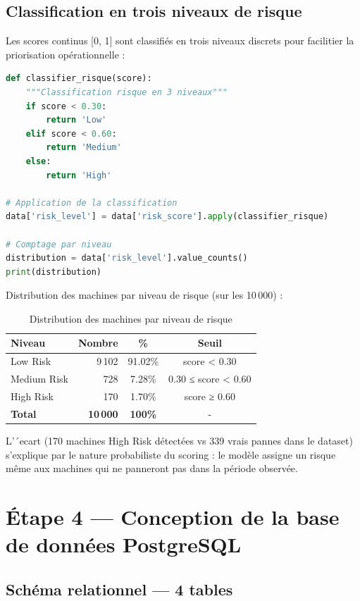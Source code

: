 \documentclass[a4paper,12pt,twoside]{report}
\begin{document}
\subsection{Classification en trois niveaux de risque}

Les scores continus [0, 1] sont classifiés en trois niveaux discrets pour facilitier la priorisation opérationnelle :

\begin{lstlisting}[language=Python]
def classifier_risque(score):
    """Classification risque en 3 niveaux"""
    if score < 0.30:
        return 'Low'
    elif score < 0.60:
        return 'Medium'
    else:
        return 'High'

# Application de la classification
data['risk_level'] = data['risk_score'].apply(classifier_risque)

# Comptage par niveau
distribution = data['risk_level'].value_counts()
print(distribution)
\end{lstlisting}

Distribution des machines par niveau de risque (sur les 10\,000) :

\begin{table}[H]
\centering
\small
\caption{Distribution des machines par niveau de risque}
\begin{tabular}{|l|r|c|c|}
\hline
\textbf{Niveau} & \textbf{Nombre} & \textbf{\%} & \textbf{Seuil} \\
\hline\hline
Low Risk & 9\,102 & 91.02\% & score < 0.30 \\
\hline
Medium Risk & 728 & 7.28\% & 0.30 ≤ score < 0.60 \\
\hline
High Risk & 170 & 1.70\% & score ≥ 0.60 \\
\hline
\textbf{Total} & \textbf{10\,000} & \textbf{100\%} & - \\
\hline
\end{tabular}
\end{table}

L'´ecart (170 machines High Risk détectées vs 339 vrais pannes dans le dataset) s'explique par le nature probabiliste du scoring : le modèle assigne un risque même aux machines qui ne panneront pas dans la période observée.

\section{Étape 4 — Conception de la base de données PostgreSQL}

\subsection{Schéma relationnel — 4 tables}
\end{document}
